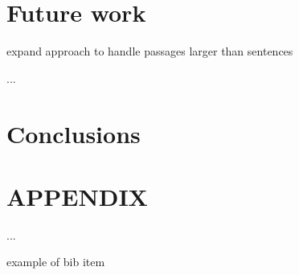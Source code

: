 \documentclass[letterpaper, 10 pt, conference]{ieeeconf}  %
\begin{document}
\section{Future work}
expand approach to handle passages larger than sentences

...
\section{Conclusions}



\addtolength{\textheight}{-12cm}   %







\section*{APPENDIX}

...



\begin{thebibliography}{99}

 example of bib item 

\end{thebibliography}
\end{document}
